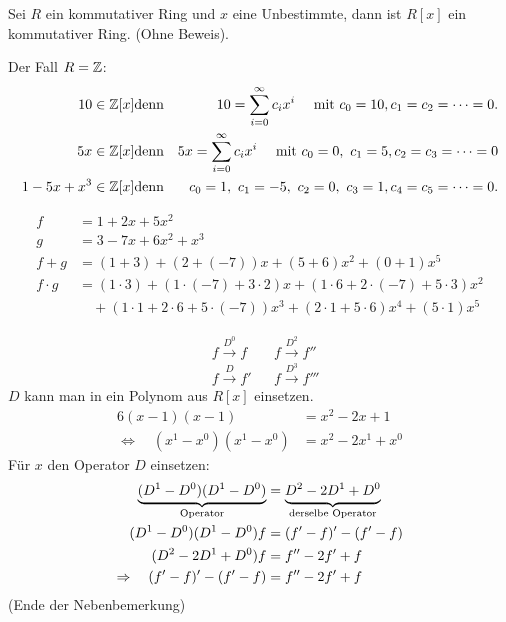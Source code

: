 \begin{propn}
	Sei $ R $ ein kommutativer Ring und $ x $ eine Unbestimmte, dann ist $ R[x] $ ein kommutativer Ring. (Ohne Beweis).
\end{propn}

\begin{bsp}
	Der Fall $ R = \mathbb Z $:
	\begin{eqnarray*}
		10 \in \mathbb Z[x] & \text{denn} & 10 = \sum_{i=0}^{\infty}c_{i}x^{i} \quad \text{ mit } c_{0} = 10, c_1 = c_2 = \cdots = 0. \\
		5x \in \mathbb Z[x] & \text{denn} & 5x = \sum_{i=0}^{\infty}c_{i}x^{i} \quad \text{ mit } c_0= 0, \ c_{1} = 5, c_2 = c_3 = \cdots = 0 \\
		1-5x+x^{3} \in \mathbb Z[x] & 
		\text{denn} & c_{0} = 1,~ c_{1} = -5, ~c_2 = 0, ~c_{3} = 1,  c_4 = c_5 = \cdots = 0.
	\end{eqnarray*}
\end{bsp}

\begin{bsp}
\begin{align*}
	f &= 1 + 2x + 5x^2 \\
	g &= 3 - 7x + 6x^2 + x^3 \\
	f + g &= (1+3) + (2+(-7))x + (5+6)x^2 + (0+1)x^5 \\
	f \cdot g &= (1 \cdot 3) + (1 \cdot (-7) + 3 \cdot 2)x + (1 \cdot 6 + 2 \cdot (-7) + 5 \cdot 3)x^2 \\
	&\quad + (1 \cdot 1 + 2 \cdot 6 + 5 \cdot (-7))x^3 + (2 \cdot 1 + 5 \cdot 6)x^4 + (5 \cdot 1)x^5
\end{align*}
\end{bsp}


\begin{bem}
	\begin{align*}
		& f \stackrel{D^0}{\longrightarrow} f && f \stackrel{D^2}{\longrightarrow} f'' \\
		& f \stackrel{D}{\longrightarrow} f' && f \stackrel{D^3}{\longrightarrow} f'''
	\end{align*}
	$ D $ kann man in ein Polynom aus $ R[x] $ einsetzen.
	\begin{align*}{6}
		( x - 1 )( x - 1 ) &= x^2 - 2x + 1 \\
		\Leftrightarrow \quad ( x^1 - x^0 )( x^1 - x^0 ) &= x^2 - 2x^1 + x^0
	\end{align*}
	Für $ x $ den Operator $ D $ einsetzen:
	\begin{align*}
		\underbrace{(D^1 - D^0)(D^1 - D^0)}_\text{Operator} &= \underbrace{\vphantom{(D^1)} D^2 - 2D^1 + D^0}_\text{derselbe Operator} \\
		(D^1 - D^0)(D^1 - D^0)f &= (f' - f)' - (f' - f) \\
		(D^2 - 2D^1 + D^0)f &= f'' - 2f' + f \\
		\Rightarrow \quad (f' - f)' - (f' - f) &= f'' - 2f' + f
	\end{align*}
(Ende der Nebenbemerkung)
\end{bem}

